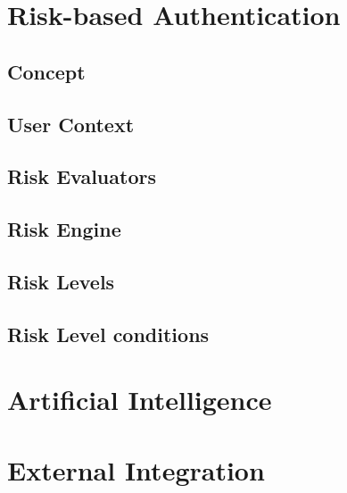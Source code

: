 \newpage
\section{Risk-based Authentication}
\subsection{Concept}
\subsection{User Context}
\subsection{Risk Evaluators}
\subsection{Risk Engine}
\subsection{Risk Levels}
\subsection{Risk Level conditions}


\section{Artificial Intelligence}


\section{External Integration}
